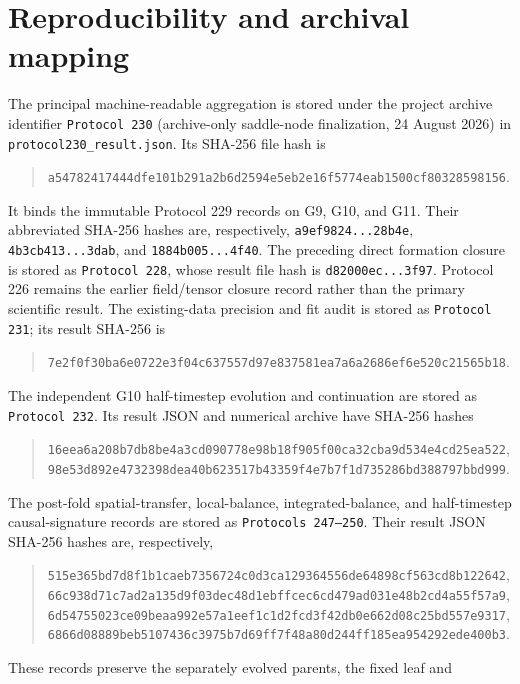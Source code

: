 \documentclass[11pt]{article}
\begin{document}
\section{Reproducibility and archival mapping}

The principal machine-readable aggregation is stored under the project
archive identifier \texttt{Protocol 230} (archive-only saddle-node
finalization, 24 August 2026) in \texttt{protocol230\_result.json}.  Its
SHA-256 file hash is
\begin{quote}
\nolinkurl{a54782417444dfe101b291a2b6d2594e5eb2e16f5774eab1500cf80328598156}.
\end{quote}
It binds the immutable Protocol 229 records on G9, G10, and G11.  Their
abbreviated SHA-256 hashes are, respectively,
\texttt{a9ef9824...28b4e}, \texttt{4b3cb413...3dab}, and
\texttt{1884b005...4f40}.  The preceding direct formation closure is stored
as \texttt{Protocol 228}, whose result file hash is
\texttt{d82000ec...3f97}.  Protocol 226 remains the earlier field/tensor
closure record rather than the primary scientific result.
The existing-data precision and fit audit is stored as \texttt{Protocol 231};
its result SHA-256 is
\begin{quote}
\nolinkurl{7e2f0f30ba6e0722e3f04c637557d97e837581ea7a6a2686ef6e520c21565b18}.
\end{quote}
The independent G10 half-timestep evolution and continuation are stored as
\texttt{Protocol 232}.  Its result JSON and numerical archive have SHA-256
hashes
\begin{quote}
\nolinkurl{16eea6a208b7db8be4a3cd090778e98b18f905f00ca32cba9d534e4cd25ea522},\\
\nolinkurl{98e53d892e4732398dea40b623517b43359f4e7b7f1d735286bd388797bbd999}.
\end{quote}
The post-fold spatial-transfer, local-balance, integrated-balance, and
half-timestep causal-signature records are stored as \texttt{Protocols
247--250}.  Their result JSON SHA-256 hashes are, respectively,
\begin{quote}
\nolinkurl{515e365bd7d8f1b1caeb7356724c0d3ca129364556de64898cf563cd8b122642},\\
\nolinkurl{66c938d71c7ad2a135d9f03dec48d1ebffcec6cd479ad031e48b2cd4a55f57a9},\\
\nolinkurl{6d54755023ce09beaa992e57a1eef1c1d2fcd3f42db0e662d08c25bd557e9317},\\
\nolinkurl{6866d08889beb5107436c3975b7d69ff7f48a80d244ff185ea954292ede400b3}.
\end{quote}
These records preserve the separately evolved parents, the fixed leaf and
\end{document}

